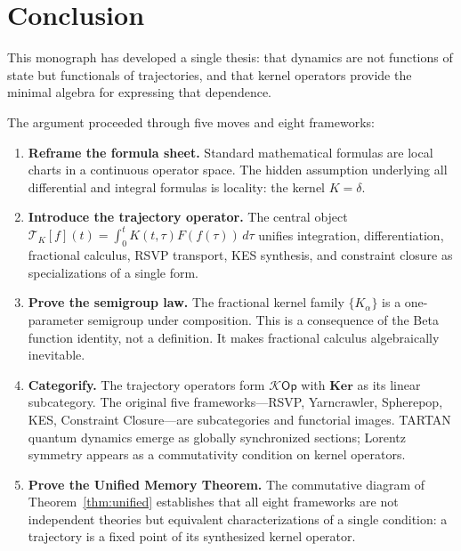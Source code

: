 \documentclass[12pt]{article}
\newcommand{\Kcal}{\mathcal{K}}
\newcommand{\TK}{\mathcal{T}_K}
\begin{document}
\section{Conclusion}
\label{sec:conclusion}

This monograph has developed a single thesis: that dynamics are not
functions of state but functionals of trajectories, and that kernel
operators provide the minimal algebra for expressing that dependence.

The argument proceeded through five moves and eight frameworks:

\begin{enumerate}
  \item \textbf{Reframe the formula sheet.} Standard mathematical formulas
    are local charts in a continuous operator space. The hidden assumption
    underlying all differential and integral formulas is locality: the
    kernel $K = \delta$.

  \item \textbf{Introduce the trajectory operator.} The central object
    $\TK[f](t) = \int_0^t K(t,\tau) F(f(\tau))\, d\tau$ unifies
    integration, differentiation, fractional calculus, RSVP transport,
    KES synthesis, and constraint closure as specializations of a single
    form.

  \item \textbf{Prove the semigroup law.} The fractional kernel family
    $\{K_\alpha\}$ is a one-parameter semigroup under composition. This
    is a consequence of the Beta function identity, not a definition.
    It makes fractional calculus algebraically inevitable.

  \item \textbf{Categorify.} The trajectory operators form $\Kcal\mathsf{Op}$
    with $\mathbf{Ker}$ as its linear subcategory. The original five
    frameworks---RSVP, Yarncrawler, Spherepop, KES, Constraint Closure---are
    subcategories and functorial images. TARTAN quantum dynamics emerge as
    globally synchronized sections; Lorentz symmetry appears as a
    commutativity condition on kernel operators.

  \item \textbf{Prove the Unified Memory Theorem.} The commutative
    diagram of Theorem~\ref{thm:unified} establishes that all eight
    frameworks are not independent theories but equivalent characterizations
    of a single condition: a trajectory is a fixed point of its synthesized
    kernel operator.
\end{enumerate}
\end{document}
